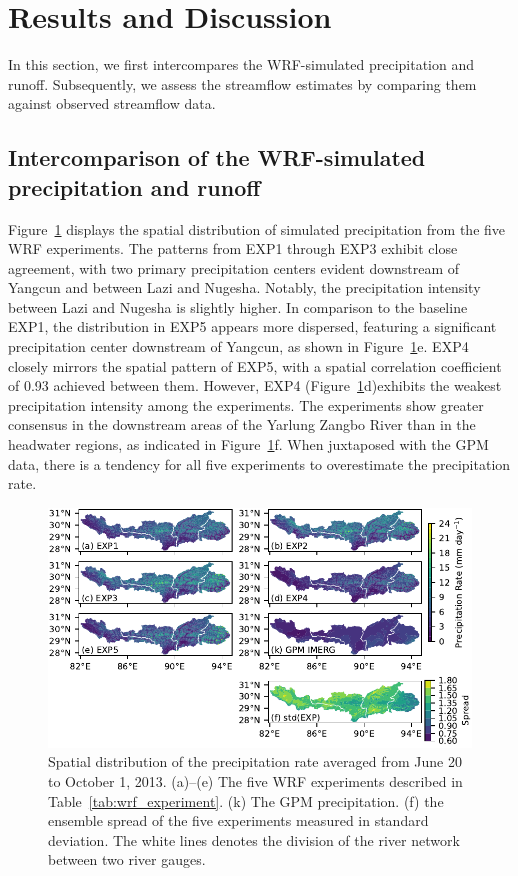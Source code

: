 \documentclass[draft]{agujournal2019}
\begin{document}
\section{Results and Discussion}
\label{sec:results}

In this section, we first intercompares the WRF-simulated precipitation and runoff. Subsequently, we assess the streamflow estimates by comparing them against observed streamflow data.

\subsection{Intercomparison of the WRF-simulated precipitation and runoff}

Figure~\ref{fig:prdist} displays the spatial distribution of simulated precipitation from the five WRF experiments. The patterns from EXP1 through EXP3 exhibit close agreement, with two primary precipitation centers evident downstream of Yangcun and between Lazi and Nugesha. Notably, the precipitation intensity between Lazi and Nugesha is slightly higher. In comparison to the baseline EXP1, the distribution in EXP5 appears more dispersed, featuring a significant precipitation center downstream of Yangcun, as shown in Figure~\ref{fig:prdist}e. EXP4 closely mirrors the spatial pattern of EXP5, with a spatial correlation coefficient of 0.93 achieved between them. However, EXP4 (Figure~\ref{fig:prdist}d)exhibits the weakest precipitation intensity among the experiments. The experiments show greater consensus in the downstream areas of the Yarlung Zangbo River than in the headwater regions, as indicated in Figure~\ref{fig:prdist}f. When juxtaposed with the GPM data, there is a tendency for all five experiments to overestimate the precipitation rate.

\begin{figure}[h!]
  \centering
  \noindent\includegraphics[width=140mm]{prrn_prdist.pdf}
  \caption{Spatial distribution of the precipitation rate averaged from June 20 to October 1, 2013. (a)--(e) The five WRF experiments described in Table~\ref{tab:wrf_experiment}. (k) The GPM precipitation. (f) the ensemble spread of the five experiments measured in standard deviation. The white lines denotes the division of the river network between two river gauges. \label{fig:prdist}}
\end{figure}
\end{document}
